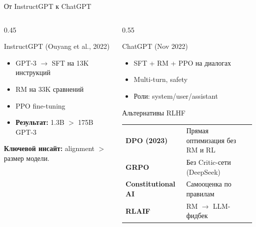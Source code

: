\documentclass[aspectratio=169, 8pt]{beamer}
\begin{document}
\begin{frame}{От InstructGPT к ChatGPT}
  \begin{columns}[T]
    \begin{column}{0.45\textwidth}
      \begin{block}{InstructGPT (Ouyang et al., 2022)}
        \begin{itemize}\small
          \item GPT-3 $\to$ SFT на 13K инструкций
          \item RM на 33K сравнений
          \item PPO fine-tuning
          \item \textbf{Результат:} 1.3B $>$ 175B GPT-3
        \end{itemize}
      \end{block}
      \textbf{Ключевой инсайт:} alignment $>$ размер модели.
    \end{column}
    \begin{column}{0.55\textwidth}
      \begin{block}{ChatGPT (Nov 2022)}
        \begin{itemize}\small
          \item SFT + RM + PPO на диалогах
          \item Multi-turn, safety
          \item Роли: system/user/assistant
        \end{itemize}
      \end{block}
      \begin{block}{Альтернативы RLHF}
        \begin{tabular}{ll}
          \textbf{DPO (2023)} & Прямая оптимизация без RM и RL \\
          \textbf{GRPO} & Без Critic-сети (DeepSeek) \\
          \textbf{Constitutional AI} & Самооценка по правилам \\
          \textbf{RLAIF} & RM $\to$ LLM-фидбек \\
        \end{tabular}
      \end{block}
    \end{column}
  \end{columns}
\end{frame}
\end{document}
